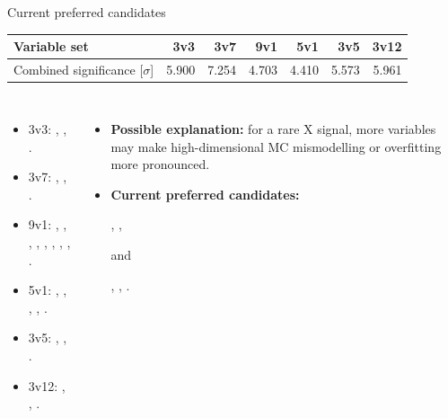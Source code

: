 \begin{frame}[label=sep_summary]{Current preferred candidates}
\small
\begin{center}\begin{tabular}{lrrrrrr}\toprule
Variable set & 3v3 & 3v7 & 9v1 & 5v1 & 3v5 & 3v12\\\midrule
Combined significance [$\sigma$] & 5.900 & 7.254 & 4.703 & 4.410 & 5.573 & 5.961\\\bottomrule
\end{tabular}\end{center}
\begin{columns}[T]
\small
\begin{itemize}\setlength{\itemsep}{2pt}
\item 3v3: , , .
\item 3v7: , , .
\item 9v1: , , , , , , , , .
\item 5v1: , , , , .
\item 3v5: , , .
\item 3v12: , , .
\end{itemize}
\small
\begin{itemize}
\item \textbf{Possible explanation:} for a rare X signal, more variables may make high-dimensional MC mismodelling or overfitting more pronounced.
\medskip
\item \textbf{Current preferred candidates:}\par\smallskip
{}, , \par\smallskip
and\par\smallskip
{}, , .
\end{itemize}
\end{columns}
\end{frame}

\begin{frame}[label=sep_thanks]{\strut}
\centering\vfill
{}
\vfill
\end{frame}

